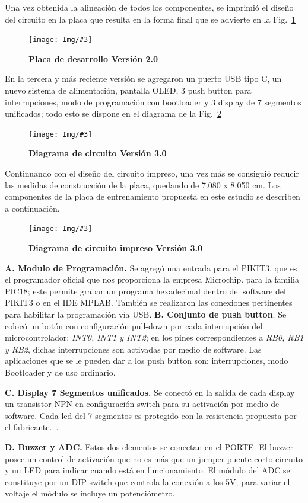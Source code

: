 \documentclass[times, 10pt,twocolumn]{article}
\newcommand{\Img}[5]{
   \begin{figure}[H]
   	   \centering
       \texttt{[image: Img/\#3]}
       \caption{ \centering \textbf{\small #4}}
       \label{#5}
   
       \end{figure}
   }
\begin{document}
Una vez obtenida la alineación de todos los componentes, se imprimió el diseño del circuito en la placa que resulta en la forma final que se advierte en la Fig.~\ref{fig:8}
\Img{8.5cm}{8.5cm}{segunda_version_final}{Placa de desarrollo Versión 2.0}{fig:8}


\vspace{-0.1cm}
En la tercera y más reciente versión se agregaron un puerto USB tipo C, un nuevo sistema de alimentación, pantalla OLED, 3 push button para interrupciones, modo de programación con bootloader y 3 display de 7 segmentos unificados; todo esto se dispone en el diagrama de la Fig.~\ref{fig:9}
\Img{8.5cm}{7.0cm}{Tercera_Version}{Diagrama de circuito Versión 3.0}{fig:9}

Continuando con el diseño del circuito impreso, una vez más se consiguió reducir las medidas de
construcción de la placa, quedando de 7.080 x 8.050 cm. Los componentes de la placa de entrenamiento propuesta en este estudio se describen a continuación.

\Img{7.5cm}{7.0cm}{tercera_version_pcb}{Diagrama de circuito impreso Versión 3.0}{fig:10}

  \textbf{A. Modulo de Programación.} Se agregó una entrada para el PIKIT3, que es el programador oficial que nos proporciona la empresa Microchip. para la familia PIC18; este permite grabar un programa hexadecimal dentro del software del PIKIT3 o en el IDE MPLAB. También se realizaron las conexiones pertinentes para habilitar la  programación vía USB.
 \newpage
 \textbf{B. Conjunto de push button}. Se colocó un botón con configuración pull-down por cada interrupción del microcontrolador: \textit{INT0, INT1 y INT2}; en los pines correspondientes a \textit{RB0, RB1 y RB2}, dichas interrupciones son activadas por medio de software.   
Las aplicaciones que se le pueden dar a los push button son: interrupciones, modo Bootloader y de uso ordinario.

 \textbf{C. Display 7 Segmentos unificados.} Se conectó en la salida de cada display un transistor NPN en configuración switch para su activación por medio de software. Cada led del 7 segmentos es protegido con la resistencia propuesta por el fabricante.~\cite{ex4}.

\textbf{D. Buzzer y ADC.} Estos dos elementos se conectan en el PORTE. El buzzer posee un control de activación que no es más que un jumper puente corto circuito y un LED para indicar cuando está en funcionamiento. El módulo del ADC se constituye por un DIP switch que controla la conexión a los 5V; para variar el voltaje el módulo se incluye un potenciómetro.
\end{document}
